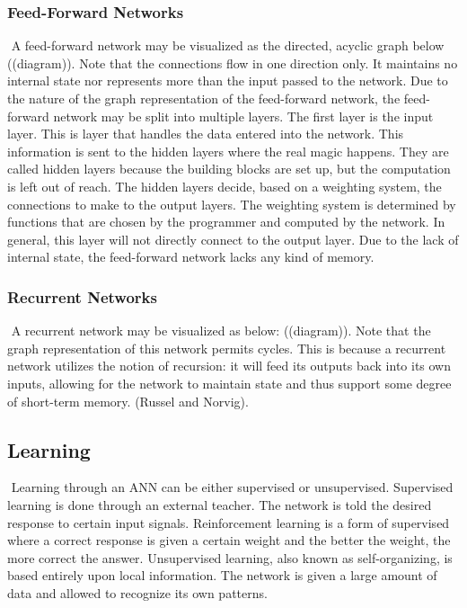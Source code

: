 \documentclass[11pt]{article}
\begin{document}
\subsubsection{Feed-Forward Networks}$ $
\indent A feed-forward network may be visualized as the directed, acyclic graph below ((diagram)). Note that the connections flow in one direction only. It maintains no internal state nor represents more than the input passed to the network.
Due to the nature of the graph representation of the feed-forward network, the feed-forward network may be split into multiple layers. The first layer is the input layer.  This is layer that handles the data entered into the network.  This information is sent to the hidden layers where the real magic happens.  They are called hidden layers because the building blocks are set up, but the computation is left out of reach.  The hidden layers decide, based on a weighting system, the connections to make to the output layers.  The weighting system is determined by functions that are chosen by the programmer and computed by the network. In general, this layer will not directly connect to the output layer. Due to the lack of internal state, the feed-forward network lacks any kind of memory.
\subsubsection{Recurrent Networks}$ $
\indent A recurrent network may be visualized as below: ((diagram)). Note that the graph representation of this network permits cycles. This is because a recurrent network utilizes the notion of recursion: it will feed its outputs back into its own inputs, allowing for the network to maintain state and thus support some degree of short-term memory. (Russel and Norvig). 

\subsection{Learning}$ $
\indent Learning through an ANN can be either supervised or unsupervised.  Supervised learning is done through an external teacher.  The network is told the desired response to certain input signals.  Reinforcement learning is a form of supervised where a correct response is given a certain weight and the better the weight, the more correct the answer.  Unsupervised learning, also known as self-organizing, is based entirely upon local information.  The network is given a large amount of data and allowed to recognize its own patterns.  
\end{document}
